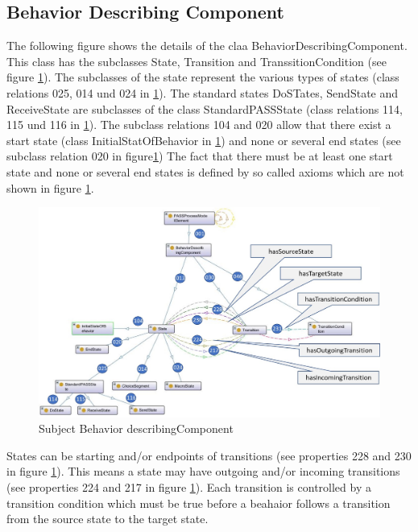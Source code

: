 \newpage

\subsection{Behavior Describing Component}
The following figure shows the details of the claa BehaviorDescribingComponent. This class has the subclasses State, Transition and TranssitionCondition (see figure \ref{fig:20190104-behavior-describing-component}). The subclasses of the state represent the various types of states (class relations 025, 014 und 024 in \ref{fig:20190104-behavior-describing-component}). The standard states DoSTates, SendState and ReceiveState are subclasses of the class StandardPASSState (class relations 114, 115 und 116 in \ref{fig:20190104-behavior-describing-component}). The subclass relations 104 and 020 allow that there exist a start state (class InitialStatOfBehavior in \ref{fig:20190104-behavior-describing-component}) and none or several end states (see subclass relation 020 in figure\ref{fig:20190104-behavior-describing-component}) The fact that there must be at least one start state and none or several end states is defined by so called axioms which are not shown in figure \ref{fig:20190104-behavior-describing-component}.
\begin{figure}[ph]
	\centering
	\includegraphics[width=1.0\linewidth]{20181026-Ontologie-Bilder/Grafiken-Ontologie/SUbjectExecution/20190104-Behavior-describing-component}
	\caption[Subject Behavior describingComponent]{Subject Behavior describingComponent}
	\label{fig:20190104-behavior-describing-component}
\end{figure}

States can be starting and/or endpoints of transitions (see properties 228 and 230 in figure \ref{fig:20190104-behavior-describing-component}). This means a state may have outgoing and/or incoming transitions (see properties 224 and 217 in figure \ref{fig:20190104-behavior-describing-component}). Each transition is controlled by a transition condition which must be true before a beahaior follows a transition from the source state to the target state.



